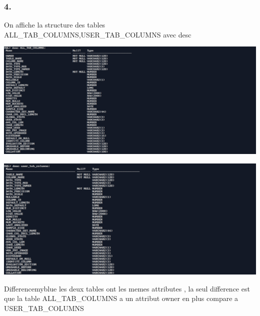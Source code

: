 \subsubsection*{4.}
On affiche la structure des tables ALL\_TAB\_COLUMNS,USER\_TAB\_COLUMNS avec desc



\begin{center}
    \includegraphics[width=\textwidth]{ScreenShot/Partie5/desc1.png}
\end{center}

\begin{center}
    \includegraphics[width=\textwidth]{ScreenShot/Partie5/desc5.png}
\end{center}

\begin{prettyBox}{Difference}{myblue}
les deux tables ont les memes attributes , la seul difference est que la table ALL\_TAB\_COLUMNS a un attribut owner en plus compare a USER\_TAB\_COLUMNS
\end{prettyBox}
